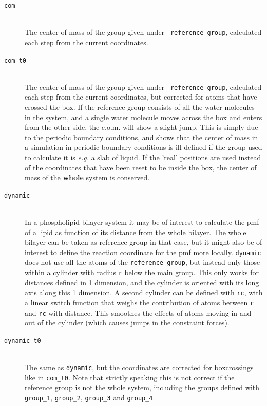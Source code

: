 \begin{description}
\item[\tt com]\mbox{}\\ The center of mass of the group given under {\tt
reference\_group}, calculated each step from the current coordinates. 
\item[\tt com\_t0]\mbox{}\\ The center of mass of the group given under {\tt
reference\_group}, calculated each step from the current coordinates,
but corrected for atoms that have crossed the box. If the reference
group consists of all the water molecules in the system, and a single
water molecule moves across the box and enters from the other side,
the c.o.m. will show a slight jump. This is simply due to the periodic
boundary conditions, and shows that the center of mass in a simulation
in periodic boundary conditions is ill defined if the group
used to calculate it is \emph{e.g.} a slab of liquid. If the 'real'
positions are used instead of the coordinates that have been reset to
be inside the box, the center of mass of the \textbf{whole} system is 
conserved. 
\item[\tt dynamic]\mbox{}\\ In a phospholipid bilayer system it may be of
interest to calculate the pmf of a lipid as function of its distance
from the whole bilayer. The whole bilayer can be taken as reference
group in that case, but it might also be of interest to define the
reaction coordinate for the pmf more locally. {\tt dynamic} does not
use all the atoms of the {\tt reference\_group}, but instead only those
within a cylinder with radius {\tt r} below the main group. This only
works for distances defined in 1 dimension, and the cylinder is
oriented with its long axis along this 1 dimension. A second cylinder
can be defined with {\tt rc}, with a linear switch function that weighs
the contribution of atoms between {\tt r} and {\tt rc} with
distance. This smoothes the effects of atoms moving in and out of the
cylinder (which causes jumps in the constraint forces). 
\item[\tt dynamic\_t0]\mbox{}\\
The same as {\tt dynamic}, but the coordinates are corrected for
boxcrossings like in {\tt com\_t0}. Note that strictly speaking this is
not correct if the reference group is not the whole system, including
the groups defined with {\tt group\_1}, {\tt group\_2}, {\tt group\_3}
and {\tt group\_4}.
\end{description}

